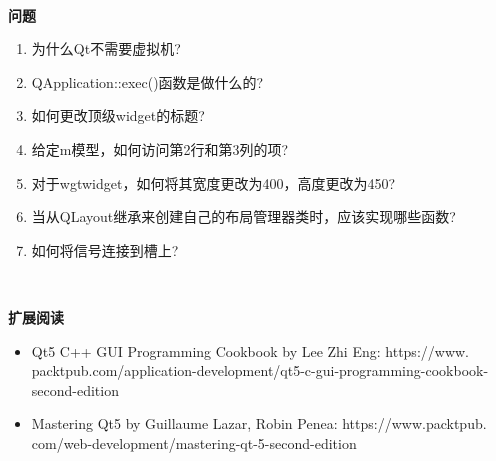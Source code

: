 \noindent\textbf{}\ \par
\textbf{问题} \ \par
\begin{enumerate}
	\item 为什么Qt不需要虚拟机?
	\item QApplication::exec()函数是做什么的?
	\item 如何更改顶级widget的标题?
	\item 给定m模型，如何访问第2行和第3列的项?
	\item 对于wgtwidget，如何将其宽度更改为400，高度更改为450?
	\item 当从QLayout继承来创建自己的布局管理器类时，应该实现哪些函数?
	\item 如何将信号连接到槽上?
\end{enumerate}

\noindent\textbf{}\ \par
\textbf{扩展阅读} \ \par
\begin{itemize}
	\item Qt5 C++ GUI Programming Cookbook by Lee Zhi Eng:  https:/​/​www.​packtpub.​com/application-​development/​qt5-​c-​gui-​programming-​cookbook-​second-​edition
	\item Mastering Qt5 by Guillaume Lazar, Robin Penea:  https:/​/​www.​packtpub.​com/web-​development/​mastering-​qt-​5-​second-​edition
\end{itemize}

\newpage



















